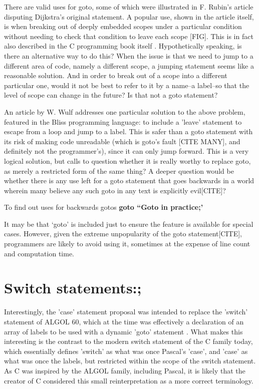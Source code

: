 \documentclass{journal}
\begin{document}
There are valid uses for goto, some of which were illustrated in F. Rubin's article \cite{gotoodeep} disputing Dijkstra's original statement. A popular use, shown in the article itself, is when breaking out of deeply embedded scopes under a particular condition without needing to check that condition to leave each scope [FIG]. This is in fact also described in the C programming book itself \cite{cprogramming}. Hypothetically speaking, is there an alternative way to do this? When the issue is that we need to jump to a different area of code, namely a different scope, a jumping statement seems like a reasonable solution. And in order to break out of a scope into a different particular one, would it not be best to refer to it by a name--a label--so that the level of scope can change in the future? Is that not a goto statement?

An article by W. Wulf \cite{againstgoto} addresses one particular solution to the above problem, featured in the Bliss programming language: to include a 'leave' statement to escape from a loop and jump to a label. This is safer than a goto statement with its risk of making code unreadable (which is goto's fault [CITE MANY], and definitely not the programmer's), since it can only jump forward. This is a very logical solution, but calls to question whether it is really worthy to replace goto, as merely a restricted form of the same thing? A deeper question would be whether there is any use left for a goto statement that goes backwards in a world wherein many believe any such goto in any text is explicitly evil[CITE]?

To find out uses for backwards gotos \textbf{goto ``Goto in practice;'}


It may be that `goto' is included just to ensure the feature is available for special cases. However, given the extreme unpopularity of the goto statement[CITE], programmers are likely to avoid using it, sometimes at the expense of line count and computation time.

\section{Switch statements:;}
Interestingly, the 'case' statement proposal was intended to replace the 'switch' statement of ALGOL 60, which at the time was effectively a declaration of an array of labels to be used with a dynamic 'goto' statement \cite{algolguide}. What makes this interesting is the contrast to the modern switch statement of the C family today, which essentially defines 'switch' as what was once Pascal's 'case', and 'case' as what was once the labels, but restricted within the scope of the switch statement. As C was inspired by the ALGOL family, including Pascal, it is likely that the creator of C considered this small reinterpretation as a more correct terminology.
\end{document}
